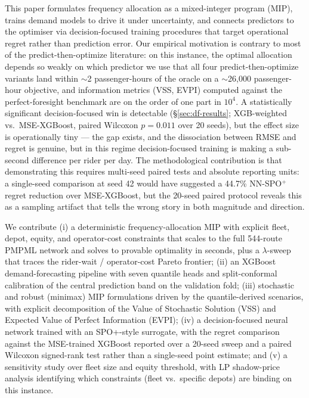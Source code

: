 \documentclass[a4paper,twoside]{article}
\begin{document}
This paper formulates frequency allocation as a mixed-integer
program (MIP), trains demand models to drive it under
uncertainty, and connects predictors to the optimiser via
decision-focused training procedures that target operational
regret rather than prediction error. Our empirical motivation is
contrary to most of the predict-then-optimize literature: on this
instance, the optimal allocation depends so weakly on which
predictor we use that all four predict-then-optimize variants
land within $\sim$2 passenger-hours of the oracle on a
$\sim$26{,}000 passenger-hour objective, and information metrics
(VSS, EVPI) computed against the perfect-foresight benchmark are
on the order of one part in $10^4$. A statistically significant
decision-focused win is detectable
(\S\ref{sec:df-results}; XGB-weighted vs.\ MSE-XGBoost, paired
Wilcoxon $p = 0.011$ over 20 seeds), but the effect size is
operationally tiny --- the gap exists, and the dissociation
between RMSE and regret is genuine, but in this regime
decision-focused training is making a sub-second difference per
rider per day. The methodological contribution is that
demonstrating this requires multi-seed paired tests and absolute
reporting units: a single-seed comparison at seed 42 would have
suggested a 44.7\% NN-SPO$^+$ regret reduction over MSE-XGBoost,
but the 20-seed paired protocol reveals this as a sampling
artifact that tells the wrong story in both magnitude and
direction.

We contribute (i) a deterministic frequency-allocation MIP with
explicit fleet, depot, equity, and operator-cost constraints
that scales to the full 544-route PMPML network and solves to
provable optimality in seconds, plus a $\lambda$-sweep that
traces the rider-wait / operator-cost Pareto frontier; (ii) an
XGBoost demand-forecasting pipeline with seven quantile heads and
split-conformal calibration of the central prediction band on the
validation fold; (iii) stochastic and robust (minimax) MIP
formulations driven by the quantile-derived scenarios, with
explicit decomposition of the Value of Stochastic Solution (VSS)
and Expected Value of Perfect Information (EVPI); (iv) a
decision-focused neural network trained with an SPO+-style
surrogate, with the regret comparison against the MSE-trained
XGBoost reported over a 20-seed sweep and a paired Wilcoxon
signed-rank test rather than a single-seed point estimate; and
(v) a sensitivity study over fleet size and equity threshold,
with LP shadow-price analysis identifying which constraints
(fleet vs.\ specific depots) are binding on this instance.
\end{document}
